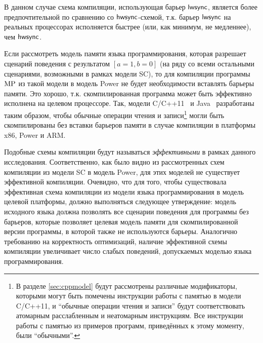 В данном случае схема компиляции, использующая барьер $\mathsf{lwsync}$, является более предпочтительной по сравнению
со $\mathsf{hwsync}$-схемой, т.к. барьер $\mathsf{lwsync}$ на реальных процессорах исполняется быстрее
(или, как минимум, не медленнее), чем $\mathsf{hwsync}$.

Если рассмотреть модель памяти языка программирования, которая разрешает сценарий поведения 
с результатом $[a=1,b=0]$
(на ряду со всеми остальными сценариями, возможными в рамках модели SC), то для компиляции программы
${\rm MP}$ из такой модели в модель Power не будет необходимости вставлять барьеры памяти.
Это хорошо, т.к. скомпилированная программа может быть эффективно исполнена на целевом процессоре.
Так, модели C/C++11~\cite{Batty-al:POPL11} и Java~\cite{Manson-al:POPL05} разработаны таким образом, чтобы
обычные операции чтения и записи\footnote{В разделе \ref{sec:cppmodel} будут рассмотрены различные модификаторы, которыми могут
быть помечены инструкции работы с памятью в модели C/C++11, и ``обычные операции чтения и записи'' будут соответствовать
атомарным расслабленным и неатомарным инструкциям.
Все инструкции работы с памятью из примеров программ, приведённых к этому моменту, были ``обычными''.}
могли быть скомпилированы без вставки барьеров памяти в случае компиляции в платформы x86, Power и ARM.

Подобные схемы компиляции будут называться \emph{эффективными} в рамках данного исследования.
Соответственно, как было видно из рассмотренных схем компиляции из модели SC в модель Power,
для этих моделей не существует эффективной компиляции.
Очевидно, что для того, чтобы существовала эффективная схема компиляции из модели языка программирования в модель
целевой платформы, должно выполняться следующее утверждение:
модель исходного языка должна позволять все сценарии поведения для программы без барьеров,
которые позволяет целевая модель памяти для скомпилированной версии программы, в которой также не используются барьеры.
Аналогично требованию на корректность оптимизаций, наличие эффективной схемы компиляции
увеличивает число слабых поведений, допускаемых моделью языка программирования.



